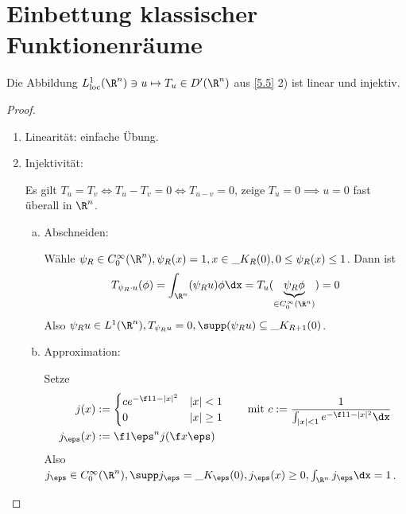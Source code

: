 \section{Einbettung klassischer Funktionenräume}


\begin{st} \label{5.7}
	Die Abbildung $L_{\text{loc}}^1(\R^n) \ni u \mapsto T_u \in D'(\R^n)$ aus \ref{5.5} 2) ist linear und injektiv.
	\begin{proof}
		\begin{enumerate}[1)]
			\item
				Linearität: einfache Übung.
			\item
				Injektivität:
				
				Es gilt $T_u = T_v \iff T_u - T_v = 0 \iff T_{u-v} = 0$, zeige $T_u = 0 \implies u = 0$ fast überall in $\R^n$.
				\begin{enumerate}[a)]
					\item
						Abschneiden:

						Wähle $\psi_R \in C_0^\infty(\R^n), \psi_R(x) = 1, x \in \_{K_R(0)}, 0 \le \psi_{R}(x) \le 1$.
						Dann ist
						\[
							T_{\psi_R \cdot u} (\phi) 
							= \int_{\R^n} (\psi_R u) \phi \dx 
							= T_u (\underbrace{\psi_R \phi}_{\in C_0^\infty(\R^n)})
							= 0
						\]
						Also $\psi_R u \in L^1(\R^n), T_{\psi_R u} = 0, \supp(\psi_R u) \subset \_{K_{R+1}(0)}$.
					\item
						Approximation:

						Setze
						\begin{align*}
							j(x) &:= \begin{cases}
								c e^{-\f 1{1-|x|^2}} & |x| < 1 \\
								0 & |x| \ge 1
							\end{cases} \qquad \text{mit }
							c := \dfrac 1{\int_{|x|< 1} e^{-\f 1{1-|x|^2}} \dx} \\
							j_\eps(x) &:= \f 1{\eps^n} j(\f x\eps)
						\end{align*}
						Also $j_\eps \in C_0^\infty(\R^n), \supp j_\eps = \_{K_\eps(0)}, j_\eps(x) \ge 0, \int_{\R^n} j_\eps \dx = 1$.


\end{enumerate}
\end{enumerate}
\end{proof}
\end{st}
